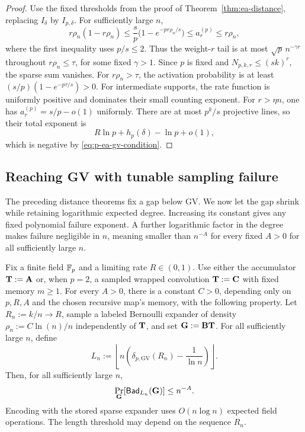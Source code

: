 \begin{proof}
Use the fixed thresholds from the proof of Theorem~\ref{thm:ea-distance},
replacing $I_\delta$ by $I_{p,\delta}$.  For sufficiently large $n$,
\[
 r\rho_n(1-r\rho_n)
 \leq \frac{s}{p}\bigl(1-e^{-pr\rho_n/s}\bigr)
 \leq a^{(p)}_r\leq r\rho_n,
\]
where the first inequality uses $p/s\leq2$.
Thus the weight-$r$ tail is at most $\sqrt p\,n^{-\gamma r}$ throughout
$r\rho_n\leq\tau$, for some fixed $\gamma>1$.
Since $p$ is fixed and $N_{p,k,r}\leq(sk)^r$, the sparse sum vanishes.
For $r\rho_n>\tau$, the activation probability is at least
$(s/p)(1-e^{-p\tau/s})>0$.  For intermediate
supports, the rate function is uniformly positive and dominates their small
counting exponent.  For $r>\eta n$, one has
$a^{(p)}_r=s/p-o(1)$ uniformly.  There are at most $p^k/s$ projective lines,
so their total exponent is
\[
 R\ln p+h_p(\delta)-\ln p+o(1),
\]
which is negative by \eqref{eq:p-ea-gv-condition}.
\end{proof}

\subsection{Reaching GV with tunable sampling failure}

The preceding distance theorems fix a gap below GV.  We now let the gap
shrink while retaining logarithmic expected degree.  Increasing its constant
gives any fixed polynomial failure exponent.  A further logarithmic factor
in the degree makes failure negligible in $n$, meaning smaller than
$n^{-A}$ for every fixed $A>0$ for all sufficiently large $n$.

\begin{theorem}
\label{thm:gv-log-degree}
Fix a finite field $\mathbb F_p$ and a limiting rate $R\in(0,1)$.
Use either the accumulator $\mathbf T:=\mathbf A$ or, when $p=2$, a sampled wrapped
convolution $\mathbf T:=\mathbf C$ with fixed memory $m\geq1$.
For every $A>0$, there is a constant $C>0$, depending only on $p,R,A$
and the chosen recursive map's memory, with the following property.
Let $R_n:=k/n\to R$, sample a labeled Bernoulli expander of density
$\rho_n:=C\ln(n)/n$ independently of $\mathbf T$, and set $\mathbf G:=\mathbf B\mathbf T$.
For all sufficiently large $n$, define
\begin{equation}
 L_n:=\left\lfloor n\left(\delta_{p,\mathrm{GV}}(R_n)
                              -\frac1{\ln n}\right)\right\rfloor.
 \label{eq:gv-moving-cutoff}
\end{equation}
Then, for all sufficiently large $n$,
\begin{equation}
 \Pr_{\mathbf G}[\mathsf{Bad}_{L_n}(\mathbf G)]\leq n^{-A}.
 \label{eq:gv-polynomial-failure}
\end{equation}
Encoding with the stored sparse expander uses $O(n\log n)$ expected field
operations.  The length threshold may depend on the sequence $R_n$.
\end{theorem}

